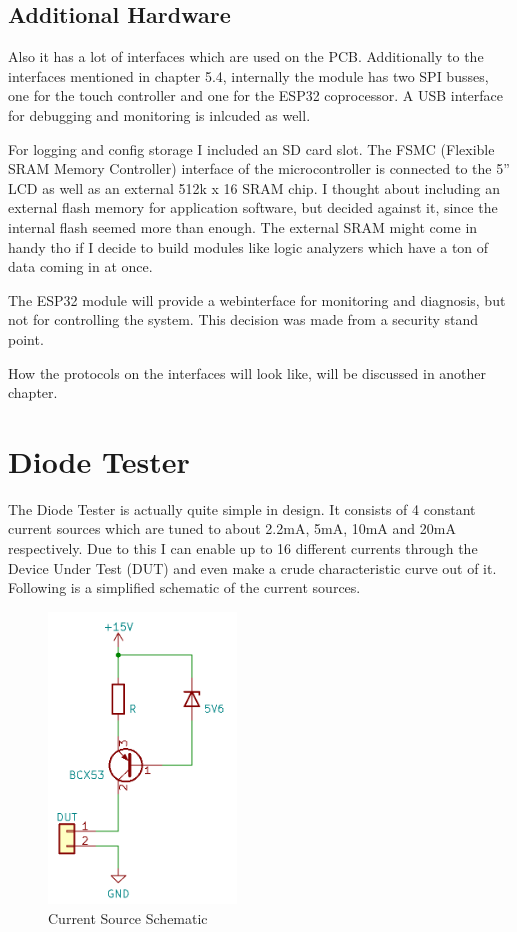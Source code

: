 \subsection{Additional Hardware}

Also it has a lot of interfaces which are used on the PCB. Additionally to the interfaces mentioned in chapter 5.4, internally the module has two SPI busses, one for the touch controller and one for the ESP32 coprocessor. A USB interface for debugging and monitoring is inlcuded as well. 

For logging and config storage I included an SD card slot. 
The FSMC (Flexible SRAM Memory Controller) interface of the microcontroller is connected to the 5'' LCD as well as an external 512k x 16 SRAM chip. I thought about including an external flash memory for application software, but decided against it, since the internal flash seemed more than enough. The external SRAM might come in handy tho if I decide to build modules like logic analyzers which have a ton of data coming in at once. 

The ESP32 module will provide a webinterface for monitoring and diagnosis, but not for controlling the system. This decision was made from a security stand point. 

How the protocols on the interfaces will look like, will be discussed in another chapter. 


\section{Diode Tester}
The Diode Tester is actually quite simple in design. It consists of 4 constant current sources which are tuned to about 2.2mA, 5mA, 10mA and 20mA respectively. Due to this I can enable up to 16 different currents through the Device Under Test (DUT) and even make a crude characteristic curve out of it. 
Following is a simplified schematic of the current sources.

\begin{figure}[H]
	\centering
		\includegraphics[width=5cm]{pictures/cc_source.png}
	\caption{Current Source Schematic}
	\label{img:CC_Diode}
\end{figure}

